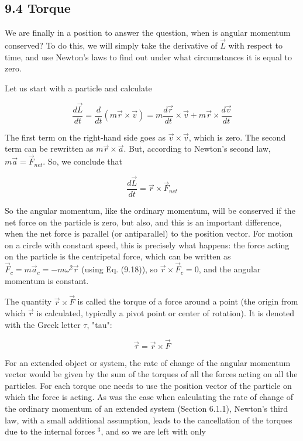 \documentclass[10pt]{article}
\begin{document}
\subsection*{9.4 Torque}
We are finally in a position to answer the question, when is angular momentum conserved? To do this, we will simply take the derivative of $\vec{L}$ with respect to time, and use Newton's laws to find out under what circumstances it is equal to zero.

Let us start with a particle and calculate


\begin{equation*}
\frac{d \vec{L}}{d t}=\frac{d}{d t}(m \vec{r} \times \vec{v})=m \frac{d \vec{r}}{d t} \times \vec{v}+m \vec{r} \times \frac{d \vec{v}}{d t} \tag{9.19}
\end{equation*}


The first term on the right-hand side goes as $\vec{v} \times \vec{v}$, which is zero. The second term can be rewritten as $m \vec{r} \times \vec{a}$. But, according to Newton's second law, $m \vec{a}=\vec{F}_{n e t}$. So, we conclude that


\begin{equation*}
\frac{d \vec{L}}{d t}=\vec{r} \times \vec{F}_{n e t} \tag{9.20}
\end{equation*}


So the angular momentum, like the ordinary momentum, will be conserved if the net force on the particle is zero, but also, and this is an important difference, when the net force is parallel (or antiparallel) to the position vector. For motion on a circle with constant speed, this is precisely what happens: the force acting on the particle is the centripetal force, which can be written as $\vec{F}_{c}=m \vec{a}_{c}=-m \omega^{2} \vec{r}$ (using Eq. (9.18)), so $\vec{r} \times \vec{F}_{c}=0$, and the angular momentum is constant.

The quantity $\vec{r} \times \vec{F}$ is called the torque of a force around a point (the origin from which $\vec{r}$ is calculated, typically a pivot point or center of rotation). It is denoted with the Greek letter $\tau$, "tau":


\begin{equation*}
\vec{\tau}=\vec{r} \times \vec{F} \tag{9.21}
\end{equation*}


For an extended object or system, the rate of change of the angular momentum vector would be given by the sum of the torques of all the forces acting on all the particles. For each torque one needs to use the position vector of the particle on which the force is acting. As was the case when calculating the rate of change of the ordinary momentum of an extended system (Section 6.1.1), Newton's third law, with a small additional assumption, leads to the cancellation of the torques due to the internal forces ${ }^{3}$, and so we are left with only
\end{document}
